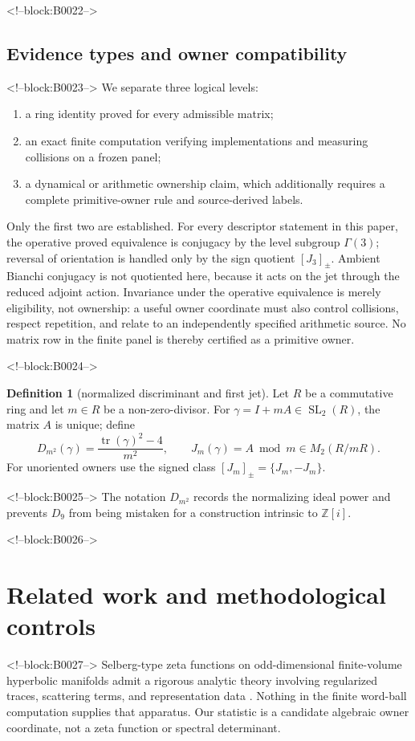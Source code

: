 \documentclass[11pt,a4paper]{article}
\theoremstyle{definition}
\newtheorem{definition}[theorem]{Definition}
\theoremstyle{remark}
\newcommand{\SL}{\operatorname{SL}}
\newcommand{\tr}{\operatorname{tr}}
\newcommand{\Gauss}{\mathbb{Z}[i]}
\begin{document}
<!--block:B0022-->
\subsection{Evidence types and owner compatibility}

<!--block:B0023-->
We separate three logical levels:
\begin{enumerate}[label=(\roman*)]
 \item a ring identity proved for every admissible matrix;
 \item an exact finite computation verifying implementations and measuring collisions on a frozen panel;
 \item a dynamical or arithmetic ownership claim, which additionally requires a complete primitive-owner rule and source-derived labels.
\end{enumerate}
Only the first two are established. For every descriptor statement in this paper, the operative proved equivalence is conjugacy by the level subgroup \(\Gamma(3)\); reversal of orientation is handled only by the sign quotient \([J_3]_{\pm}\). Ambient Bianchi conjugacy is not quotiented here, because it acts on the jet through the reduced adjoint action. Invariance under the operative equivalence is merely eligibility, not ownership: a useful owner coordinate must also control collisions, respect repetition, and relate to an independently specified arithmetic source. No matrix row in the finite panel is thereby certified as a primitive owner.

<!--block:B0024-->
\begin{definition}[normalized discriminant and first jet]
Let \(R\) be a commutative ring and let \(m\in R\) be a non-zero-divisor.
For \(\gamma=I+mA\in\SL_2(R)\), the matrix \(A\) is unique; define
\[
 D_{m^2}(\gamma)=\frac{\tr(\gamma)^2-4}{m^2},
 \qquad J_m(\gamma)=A\bmod m\in M_2(R/mR).
\]
For unoriented owners use the signed class \([J_m]_{\pm}=\{J_m,-J_m\}\).
\end{definition}

<!--block:B0025-->
The notation \(D_{m^2}\) records the normalizing ideal power and prevents \(D_9\) from being mistaken for a construction intrinsic to \(\Gauss\).

<!--block:B0026-->
\section{Related work and methodological controls}

<!--block:B0027-->
Selberg-type zeta functions on odd-dimensional finite-volume hyperbolic manifolds admit a rigorous analytic theory involving regularized traces, scattering terms, and representation data \citep[abstract and Secs.~3--5]{Pfaff2015}. Nothing in the finite word-ball computation supplies that apparatus. Our statistic is a candidate algebraic owner coordinate, not a zeta function or spectral determinant.
\end{document}

